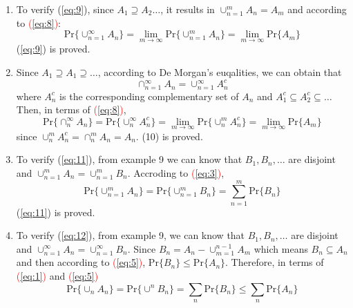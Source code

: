 \documentclass[UTF8]{article}
\begin{document}
\begin{enumerate}[1.]
        Then, since $B_1,B_2,\dots$ are disjoint, according to \textcolor{red}{(\ref{eq:1})} and \textcolor{red}{(\ref{eq:3})}
        \begin{equation*}
            \text{Pr}\{\cup^\infty_{n=1}A_n\}=\text{Pr}\{\cup^\infty_{n=1}B_n\}=\lim_{m\rightarrow\infty}\sum^m_{n=1}\text{Pr}\{B_n\}=\lim_{m\rightarrow\infty}\text{Pr}\{\cup^m_{n=1}B_n\}=\lim_{m\rightarrow\infty}\text{Pr}\{\cup^m_{n=1}A_n\}
        \end{equation*}
        (\ref{eq:8}) is proved
        \item To verify (\ref{eq:9}), since $A_1\supseteq A_2\dots$, it results in $\cup^m_{n=1}A_n=A_m$ and according to \textcolor{red}{(\ref{eq:8})}:
        \begin{equation*}
            \text{Pr}\big\{\cup^\infty_{n=1}A_n\big\}=\lim_{m\rightarrow\infty}\text{Pr}\{\cup^m_{n=1}A_n\}=\lim_{m\rightarrow\infty}\text{Pr}\{A_m\}
        \end{equation*}
        (\ref{eq:9}) is proved.
        \item Since $A_1\supseteq A_1\supseteq\dots$, according to De Morgan's euqalities, we can obtain that 
        \begin{equation*}
            \cap^\infty_{n=1}A_n=\cup^\infty_{n=1}A_n^c
        \end{equation*}
        where $A^c_n$ is the corresponding complementary set of $A_n$ and $A^c_1\subseteq A^c_2\subseteq\dots$ Then, in terms of \textcolor{red}{(\ref{eq:8})},
        \begin{equation*}
            \text{Pr}\{\cap^\infty_nA_n\}=\text{Pr}\{\cup^\infty_nA^c_n\}=\lim_{m\rightarrow\infty}\text{Pr}\{\cup^m_nA^c_n\}=\lim_{m\rightarrow\infty}\text{Pr}\{A_m\}
        \end{equation*}
        since $\cup^m_nA^c_n=\cap^m_nA_n=A_n$. (10) is proved.
        \item To verify (\ref{eq:11}), from example 9 we can know that $B_1,B_n,\dots$ are disjoint and $\cup^m_{n=1}A_n=\cup^m_{n=1}B_n$. Accroding to \textcolor{red}{(\ref{eq:3})},
        \begin{equation*}
            \text{Pr}\{\cup^m_{n=1}A_n\}=\text{Pr}\{\cup^m_{n=1}B_n\}=\sum^m_{n=1}\text{Pr}\{B_n\}
        \end{equation*}
        (\ref{eq:11}) is proved.
        \item To verify (\ref{eq:12}), from example 9, we can know that $B_1,B_n,\dots$ are disjoint and $\cup^\infty_{n=1}A_n=\cup^\infty_{n=1}B_n$. Since $B_n=A_n-\cup^{n-1}_{m=1}A_m$ which means $B_n\subseteq A_n$ and then according to \textcolor{red}{(\ref{eq:5})}, $\text{Pr}\{B_n\}\leq\text{Pr}\{A_n\}$. Therefore, in terms of \textcolor{red}{(\ref{eq:1})} and \textcolor{red}{(\ref{eq:5})}
        \begin{equation*}
            \text{Pr}\{\cup_nA_n\}=\text{Pr}\{\cup^nB_n\}=\sum_n\text{Pr}\{B_n\}\leq\sum_n\text{Pr}\{A_n\}
        \end{equation*}
    \end{enumerate}
\end{document}
